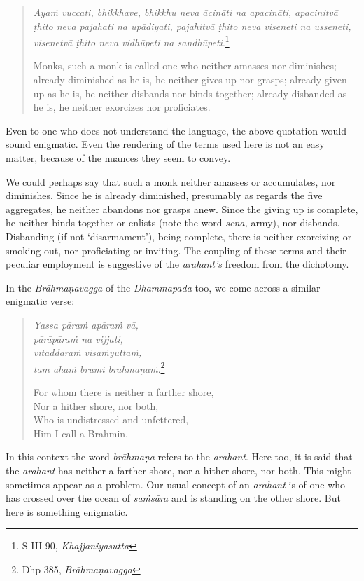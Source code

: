 \begin{quote}
\emph{Ayaṁ vuccati, bhikkhave, bhikkhu neva ācināti na apacināti, apacinitvā ṭhito neva pajahati na upādiyati, pajahitvā ṭhito neva viseneti na usseneti, visenetvā ṭhito neva vidhūpeti na sandhūpeti}.\footnote{S III 90, \emph{Khajjaniyasutta}}

Monks, such a monk is called one who neither amasses nor diminishes; already diminished as he is, he neither gives up nor grasps; already given up as he is, he neither disbands nor binds together; already disbanded as he is, he neither exorcizes nor proficiates.
\end{quote}

Even to one who does not understand the language, the above quotation would sound enigmatic. Even the rendering of the terms used here is not an easy matter, because of the nuances they seem to convey.

We could perhaps say that such a monk neither amasses or accumulates, nor diminishes. Since he is already diminished, presumably as regards the five aggregates, he neither abandons nor grasps anew. Since the giving up is complete, he neither binds together or enlists (note the word \emph{sena,} army), nor disbands. Disbanding (if not `disarmament'), being complete, there is neither exorcizing or smoking out, nor proficiating or inviting. The coupling of these terms and their peculiar employment is suggestive of the \emph{arahant's} freedom from the dichotomy.

In the \emph{Brāhmaṇavagga} of the \emph{Dhammapada} too, we come across a similar enigmatic verse:

\clearpage

\begin{quote}
\emph{Yassa pāraṁ apāraṁ vā,}\\
\emph{pārāpāraṁ na vijjati,}\\
\emph{vītaddaraṁ visaṁyuttaṁ,}\\
\emph{tam ahaṁ brūmi brāhmaṇaṁ}.\footnote{Dhp 385, \emph{Brāhmaṇavagga}}

For whom there is neither a farther shore,\\
Nor a hither shore, nor both,\\
Who is undistressed and unfettered,\\
Him I call a Brahmin.
\end{quote}

In this context the word \emph{brāhmaṇa} refers to the \emph{arahant}. Here too, it is said that the \emph{arahant} has neither a farther shore, nor a hither shore, nor both. This might sometimes appear as a problem. Our usual concept of an \emph{arahant} is of one who has crossed over the ocean of \emph{saṁsāra} and is standing on the other shore. But here is something enigmatic.

